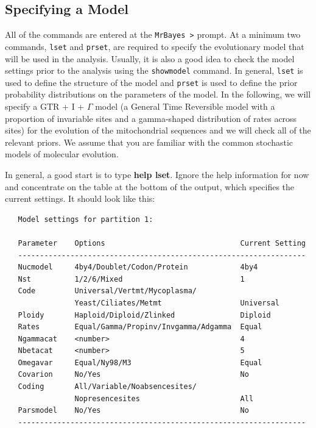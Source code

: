 \documentclass[12pt]{book}
\begin{document}
\subsection{Specifying a Model}
All of the commands are entered at the \texttt{MrBayes >} prompt. At a minimum two commands, \texttt{lset}
 and \texttt{prset}, are required to specify the evolutionary model that will be used in the analysis.
 Usually, it is also a good idea to check the model settings prior to the analysis using the 
 \texttt{showmodel} command. In general, \texttt{lset} is used to define the structure of the model and
 \texttt{prset} is used to define the prior probability distributions on the parameters of the model. In
 the following, we will specify a GTR + I + $\Gamma$ model (a General Time Reversible model with a proportion
 of invariable sites and a gamma-shaped distribution of rates across sites) for the evolution of the
 mitochondrial sequences and we will check all of the relevant priors. We assume that you are familiar with
 the common stochastic models of molecular evolution.

In general, a good start is to type \textbf{help lset}. Ignore the help information for now and concentrate
 on the table at the bottom of the output, which specifies the current settings. It should look like this:

\begin{singlespacing}
\small
\begin{verbatim}
   Model settings for partition 1:
 
   Parameter    Options                               Current Setting
   ------------------------------------------------------------------
   Nucmodel     4by4/Doublet/Codon/Protein            4by4                         
   Nst          1/2/6/Mixed                           1                         
   Code         Universal/Vertmt/Mycoplasma/                                     
                Yeast/Ciliates/Metmt                  Universal                         
   Ploidy       Haploid/Diploid/Zlinked               Diploid                         
   Rates        Equal/Gamma/Propinv/Invgamma/Adgamma  Equal                         
   Ngammacat    <number>                              4                         
   Nbetacat     <number>                              5                         
   Omegavar     Equal/Ny98/M3                         Equal                         
   Covarion     No/Yes                                No                         
   Coding       All/Variable/Noabsencesites/                                     
                Nopresencesites                       All                         
   Parsmodel    No/Yes                                No                         
   ------------------------------------------------------------------
\end{verbatim}
\normalsize
\end{singlespacing}
\end{document}
